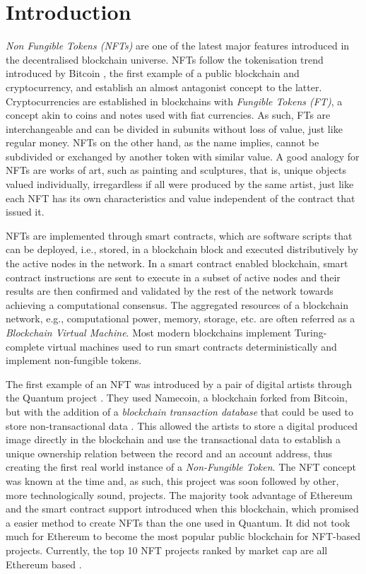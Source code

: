 \documentclass[../NFTComp_IEEE.tex]{subfiles}
\begin{document}
\section{Introduction}
\label{sec:introduction}
\textit{Non Fungible Tokens (NFTs)} are one of the latest major features introduced in the decentralised blockchain universe. NFTs follow the tokenisation trend introduced by Bitcoin \cite{Nakamoto2008}, the first example of a public blockchain and cryptocurrency, and establish an almost antagonist concept to the latter. Cryptocurrencies are established in blockchains with \textit{Fungible Tokens (FT)}, a concept akin to coins and notes used with fiat currencies. As such, FTs are interchangeable and can be divided in subunits without loss of value, just like regular money. NFTs on the other hand, as the name implies, cannot be subdivided or exchanged by another token with similar value. A good analogy for NFTs are works of art, such as painting and sculptures, that is, unique objects valued individually, irregardless if all were produced by the same artist, just like each NFT has its own characteristics and value independent of the contract that issued it.
\par
NFTs are implemented through smart contracts, which are software scripts that can be deployed, i.e., stored, in a blockchain block and executed distributively by the active nodes in the network. In a smart contract enabled blockchain, smart contract instructions are sent to execute in a subset of active nodes and their results are then confirmed and validated by the rest of the network towards achieving a computational consensus. The aggregated resources of a blockchain network, e.g., computational power, memory, storage, etc. are often referred as a \textit{Blockchain Virtual Machine}. Most modern blockchains implement Turing-complete virtual machines used to run smart contracts deterministically and implement non-fungible tokens.
\par
The first example of an NFT was introduced by a pair of digital artists through the Quantum project \cite{Exmundo2023}. They used Namecoin, a blockchain forked from Bitcoin, but with the addition of a \textit{blockchain transaction database} that could be used to store non-transactional data \cite{Loibl2014}. This allowed the artists to store a digital produced image directly in the blockchain and use the transactional data to establish a unique ownership relation between the record and an account address, thus creating the first real world instance of a \textit{Non-Fungible Token}. The NFT concept was known at the time and, as such, this project was soon followed by other, more technologically sound, projects. The majority took advantage of Ethereum and the smart contract support introduced when this blockchain, which promised a easier method to create NFTs than the one used in Quantum. It did not took much for Ethereum to become the most popular public blockchain for NFT-based projects. Currently, the top 10 NFT projects ranked by market cap are all Ethereum based \cite{CoinGecko2024}.
\end{document}
